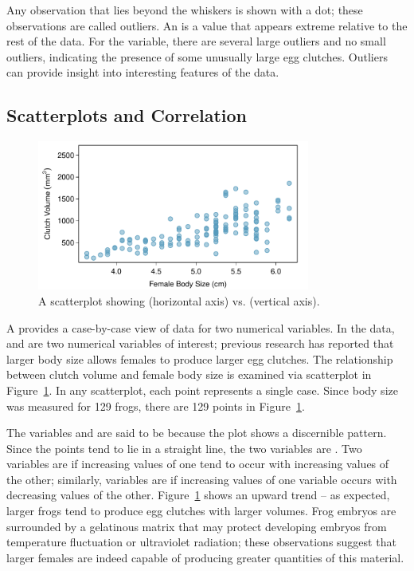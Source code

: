 Any observation that lies beyond the whiskers is shown with a dot; these observations are called outliers. An  is a value that appears extreme relative to the rest of the data. For the  variable, there are several large outliers and no small outliers, indicating the presence of some unusually large egg clutches. Outliers can provide insight into interesting features of the data. 

\subsection{Scatterplots and Correlation}
\label{scatterPlots}

\begin{figure}[h!]
	\centering
	\includegraphics[width=0.8\textwidth]
	{ch_intro_to_data_oi_biostat/figures/frogClutchVolBodySize/frogClutchVolBodySize}
	\caption{A scatterplot showing  (horizontal axis) vs.  (vertical axis). }
	\label{frogClutchVolBodySize}
\end{figure}

A  provides a case-by-case view of data for two numerical variables. In the  data,  and  are two numerical variables of interest; previous research has reported that larger body size allows females to produce larger egg clutches. The relationship between clutch volume and female body size is examined via scatterplot in Figure~\ref{frogClutchVolBodySize}. In any scatterplot, each point represents a single case. Since body size was measured for 129 frogs, there are 129 points in Figure~\ref{frogClutchVolBodySize}.

The variables  and  are said to be  because the plot shows a discernible pattern. Since the points tend to lie in a straight line, the two variables are . Two variables are  if increasing values of one tend to occur with increasing values of the other; similarly, variables are  if increasing values of one variable occurs with decreasing values of the other. Figure~\ref{frogClutchVolBodySize} shows an upward trend -- as expected, larger frogs tend to produce egg clutches with larger volumes. Frog embryos are surrounded by a gelatinous matrix that may protect developing embryos from temperature fluctuation or ultraviolet radiation; these observations suggest that larger females are indeed capable of producing greater quantities of this material.

